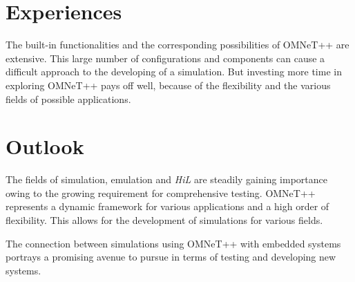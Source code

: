 \section{Experiences}
\label{sec:conclusion_experiences}
The built-in functionalities and the corresponding possibilities of OMNeT++ are extensive.
This large number of configurations and components can cause a difficult approach to the developing of a simulation.
But investing more time in exploring OMNeT++ pays off well, because of the flexibility and the various fields of possible applications.

\section{Outlook}
\label{sec:conclusion_outlook}
The fields of simulation, emulation and \emph{HiL} are steadily gaining importance owing to the growing requirement for comprehensive testing.
OMNeT++ represents a dynamic framework for various applications and a high order of flexibility.
This allows for the development of simulations for various fields.

The connection between simulations using OMNeT++ with embedded systems portrays a promising avenue to pursue in terms of testing and developing new systems.